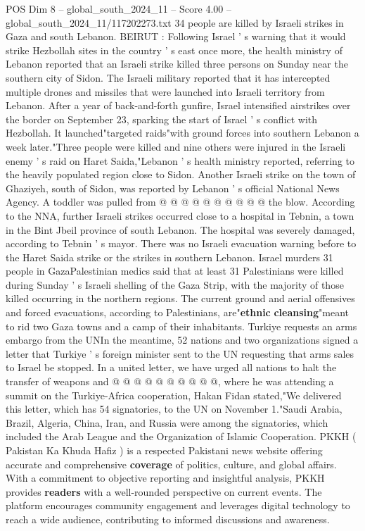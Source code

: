 \begin{textsample}{POS Dim 8 – global\_south\_2024\_11 – Score 4.00 – global\_south\_2024\_11/117202273.txt}  \label{ex:f8_pos_154}
34 people are killed by Israeli strikes in Gaza and south Lebanon.
BEIRUT : Following Israel ' s warning that it would strike Hezbollah sites in the country ' s east once more, the health ministry of Lebanon reported that an Israeli strike killed three persons on Sunday near the southern city of Sidon.
The Israeli military reported that it has intercepted multiple drones and missiles that were launched into Israeli territory from Lebanon.
After a year of back-and-forth gunfire, Israel intensified airstrikes over the border on September 23, sparking the start of Israel ' s conflict with Hezbollah.
It launched"targeted raids"with ground forces into southern Lebanon a week later."Three people were killed and nine others were injured in the Israeli enemy ' s raid on Haret Saida,"Lebanon ' s health ministry reported, referring to the heavily populated region close to Sidon.
Another Israeli strike on the town of Ghaziyeh, south of Sidon, was reported by Lebanon ' s official National News Agency.
A toddler was pulled from @ @ @ @ @ @ @ @ @ @ the blow.
According to the NNA, further Israeli strikes occurred close to a hospital in Tebnin, a town in the Bint Jbeil province of south Lebanon.
The hospital was severely damaged, according to Tebnin ' s mayor.
There was no Israeli evacuation warning before to the Haret Saida strike or the strikes in southern Lebanon.
Israel murders 31 people in GazaPalestinian medics said that at least 31 Palestinians were killed during Sunday ' s Israeli shelling of the Gaza Strip, with the majority of those killed occurring in the northern regions.
The current ground and aerial offensives and forced evacuations, according to Palestinians, are"\textbf{ethnic} \textbf{cleansing}"meant to rid two Gaza towns and a camp of their inhabitants.
Turkiye requests an arms embargo from the UNIn the meantime, 52 nations and two organizations signed a letter that Turkiye ' s foreign minister sent to the UN requesting that arms sales to Israel be stopped.
In a united letter, we have urged all nations to halt the transfer of weapons and @ @ @ @ @ @ @ @ @ @, where he was attending a summit on the Turkiye-Africa cooperation, Hakan Fidan stated,"We delivered this letter, which has 54 signatories, to the UN on November 1."Saudi Arabia, Brazil, Algeria, China, Iran, and Russia were among the signatories, which included the Arab League and the Organization of Islamic Cooperation.
PKKH ( Pakistan Ka Khuda Hafiz ) is a respected Pakistani news website offering accurate and comprehensive \textbf{coverage} of politics, culture, and global affairs.
With a commitment to objective reporting and insightful analysis, PKKH provides \textbf{readers} with a well-rounded perspective on current events.
The platform encourages community engagement and leverages digital technology to reach a wide audience, contributing to informed discussions and awareness.

\end{textsample}
